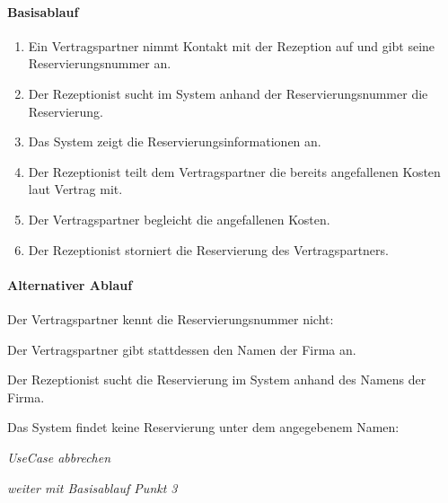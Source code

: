 \paragraph{Basisablauf}
\begin{enumerate}
\item Ein \Gls{Vertragspartner} nimmt Kontakt mit der \Gls{Rezeption} auf und gibt seine \Gls{Reservierungsnummer} an.
\item Der \Gls{Rezeptionist} sucht im System anhand der \Gls{Reservierungsnummer} die \Gls{Reservierung}.
\item Das System zeigt die Reservierungsinformationen an.
\item Der \Gls{Rezeptionist} teilt dem \Gls{Vertragspartner} die bereits angefallenen Kosten laut Vertrag mit.
\item Der \Gls{Vertragspartner} begleicht die angefallenen Kosten.
\item Der \Gls{Rezeptionist} storniert die \Gls{Reservierung} des \Gls{Vertragspartner}s.
\end{enumerate}

\paragraph{Alternativer Ablauf}
\begin{longenum}
	\item
	\begin{longenum}
		\item Der \Gls{Vertragspartner} kennt die \Gls{Reservierungsnummer} nicht:
		\begin{longenum}
			\item Der \Gls{Vertragspartner} gibt stattdessen den Namen der Firma an.
			\item Der \Gls{Rezeptionist} sucht die \Gls{Reservierung} im System anhand des Namens der Firma.
			\begin{longenum}
				\item Das System findet keine \Gls{Reservierung} unter dem angegebenem Namen:
				\begin{longenum}
					\item \emph{UseCase abbrechen}
				\end{longenum}
			\end{longenum}
			\item \emph{weiter mit Basisablauf Punkt 3}
		\end{longenum}
	\end{longenum}
	
	\item
	\item
	\item
	\item
\end{longenum}

